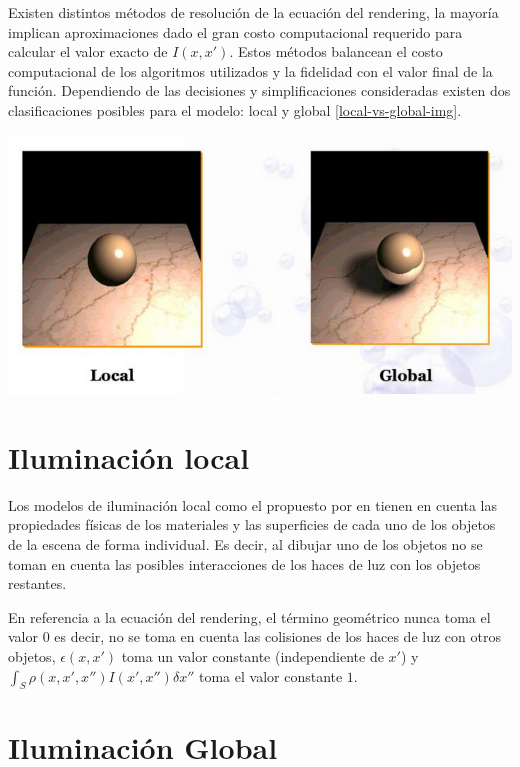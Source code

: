 Existen distintos métodos de resolución de la ecuación del rendering, la mayoría implican aproximaciones dado el gran costo 
computacional requerido para calcular el valor exacto de $I(x,x')$. Estos métodos balancean el costo computacional de los algoritmos
utilizados y la fidelidad con el valor final de la función. Dependiendo de las decisiones y simplificaciones consideradas
existen dos clasificaciones posibles para el modelo: local y global \ref{local-vs-global-img}.

\begin{minipage}[h]{0.8\linewidth}
    \includegraphics[width=\linewidth]{assets/local_vs_global}
    \label{local-vs-global-img}
\end{minipage}

\section{Iluminación local}
\label{sec:ilumlocal}
Los modelos de iluminación local como el propuesto por \citeauthor{Phong} en \citeyear{Phong} tienen en cuenta las propiedades físicas de los materiales
y las superficies de cada uno de los objetos de la escena de forma individual. Es decir, al dibujar uno de los
objetos no se toman en cuenta las posibles interacciones de los haces de luz con los objetos restantes.

En referencia a la ecuación del rendering, el término
geométrico nunca toma el valor 0 es decir, no se toma en cuenta las colisiones de los haces de luz con otros
objetos, $\epsilon(x,x')$ toma un valor constante (independiente de $x'$) y $\int_{S} \rho(x,x',x'')I(x',x'') \delta x''$ toma el valor constante $1$.

\section{Iluminación Global}
\label{sec:ilumglobal}

